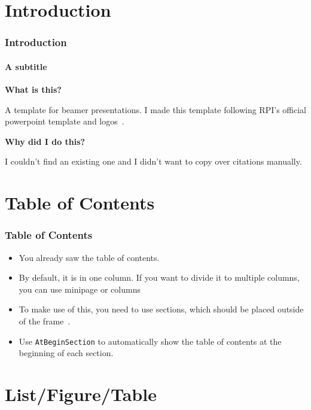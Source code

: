 \documentclass[
	10pt, %
	aspectratio=169, %
]{beamer}
\begin{document}

\section{Introduction}
\begin{frame}
	\frametitle{Introduction} %
	\framesubtitle{A subtitle}
	{
		\Large \bf
		What is this?
	}

	A template for beamer presentations.
	I made this template following RPI's official powerpoint template and logos~\cite{rpiHomeStrategicCommunications}.

	\vspace{1cm}
	{
		\Large \bf
		Why did I do this?
	}

	I couldn't find an existing one and I didn't want to copy over citations manually.

\end{frame}

\section{Table of Contents}
\begin{frame}
	\frametitle{Table of Contents}
	\begin{itemize}
		\item You already saw the table of contents.
		\item By default, it is in one column. If you want to divide it to multiple columns, you can use minipage or columns~\cite{samcarter_is_at_topanswers.xyzAnswerBeamerVertical2013}
		\item To make use of this, you need to use sections, which should be placed outside of the frame~\cite{campaAnswerAtbeginsectionReturns2022}.
		\item Use \texttt{AtBeginSection} to automatically show the table of contents at the beginning of each section.
	\end{itemize}
\end{frame}


\section{List/Figure/Table}
\end{document}
